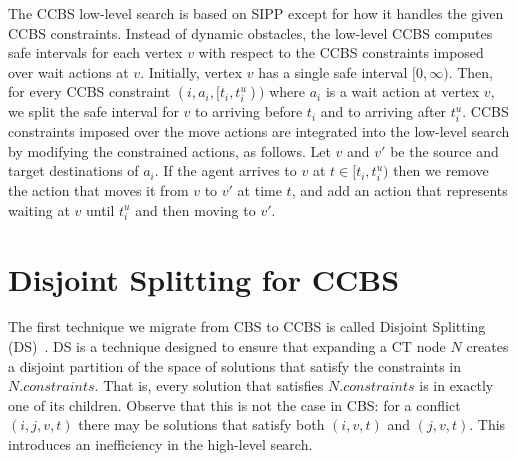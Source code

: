 \documentclass[letterpaper]{article} %
\newcommand\roni[1]{\nb{\textbf{Roni:}}{orange}{#1}}
\newcommand{\cbs}{\ac{CBS}\xspace}
\newcommand{\ccbs}{\ac{CCBS}\xspace}
\newcommand{\ct}{\ac{CT}\xspace}
\newcommand{\sipp}{\ac{SIPP}\xspace}
\newcommand{\const}{\textit{constraints}\xspace}
\newcommand{\ds}{\ac{DS}\xspace}
\begin{document}
The \ccbs low-level search is based on \sipp except for how it handles the given \ccbs constraints.
Instead of dynamic obstacles, the low-level \ccbs computes safe intervals for each vertex $v$ with respect to the \ccbs constraints imposed over wait actions at $v$.
Initially, vertex $v$ has a single safe interval $[0, \infty)$.
Then, for every \ccbs constraint $(i, a_i, [t_i, t_i^u))$
where $a_i$ is a wait action at vertex $v$, we split the safe interval for $v$
to arriving before $t_i$ and to arriving after $t_i^u$.
\ccbs constraints imposed over the move actions are integrated into the low-level search by modifying the constrained actions, as follows.
Let $v$ and $v'$ be the source and target destinations of $a_i$.
If the agent arrives to $v$ at $t\in [t_i, t^u_i)$ then we remove the action that moves it from $v$ to $v'$ at time $t$, and add an action that represents waiting at $v$ until $t^u_i$ and then moving to $v'$.






\section{Disjoint Splitting for \ccbs}

The first technique we migrate from \cbs to \ccbs is called Disjoint Splitting (\ds)~\cite{li2019disjoint}.
\ds is a technique designed to ensure that expanding a \ct node $N$ creates a disjoint partition of the space of solutions that satisfy the constraints in $N.\const$.
That is, every solution that satisfies $N.\const$ is in exactly one of its children. Observe that this is not the case in \cbs: for a conflict $(i,j,v,t)$ there may be solutions that satisfy both $(i,v,t)$ and $(j,v,t)$.
This introduces an inefficiency in the high-level search.
\end{document}
